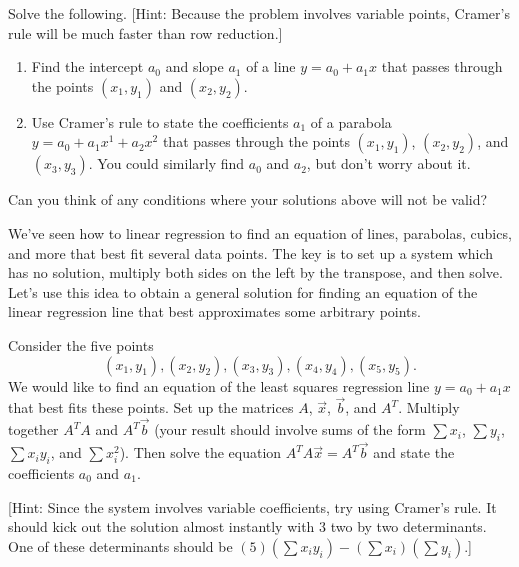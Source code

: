 \mysubsection{\ideapro}
\begin{problem}
Solve the following. [Hint: Because the problem involves variable points, Cramer's rule will be much faster than row reduction.]
\begin{enumerate}
 \item Find the intercept $a_0$ and slope $a_1$ of a line $y = a_0+a_1 x$ that passes through the points $(x_1,y_1)$ and $(x_2,y_2)$. 
 \item Use Cramer's rule to state the coefficients $a_1$ of a parabola $y = a_0+a_1 x^1+a_2x^2$ that passes through the points $(x_1, y_1)$,  $(x_2, y_2)$, and  $(x_3, y_3)$. You could similarly find $a_0$ and $a_2$, but don't worry about it.
\end{enumerate}
Can you think of any conditions where your solutions above will not be valid?
\end{problem}














We've seen how to linear regression to find an equation of lines, parabolas, cubics, and more that best fit several data points. The key is to set up a system which has no solution, multiply both sides on the left by the transpose, and then solve. Let's use this idea to obtain a general solution for finding an equation of the linear regression line that best approximates some arbitrary points. 

\begin{problem}
 Consider the five points 
 $$
 (x_1,y_1),
 (x_2,y_2),
 (x_3,y_3),
 (x_4,y_4),
 (x_5,y_5).
$$
We would like to find an equation of the least squares regression line $y=a_0+a_1x$ that best fits these points. 
Set up the matrices $A$, $\vec x$, $\vec b$, and $A^T$. Multiply together $A^TA$ and $A^T\vec b$ (your result should involve sums of the form $\sum x_i$, $\sum y_i$, $\sum x_iy_i$, and $\sum x_i^2$). Then solve the equation $A^TA\vec x = A^T\vec b$ and state the coefficients $a_0$ and $a_1$. 

[Hint: Since the system involves variable coefficients, try using Cramer's rule. It should kick out the solution almost instantly with 3 two by two determinants. One of these determinants should be $(5)\left(\sum x_iy_i\right) - \left(\sum x_i\right)\left(\sum y_i\right)$.]
\end{problem}

